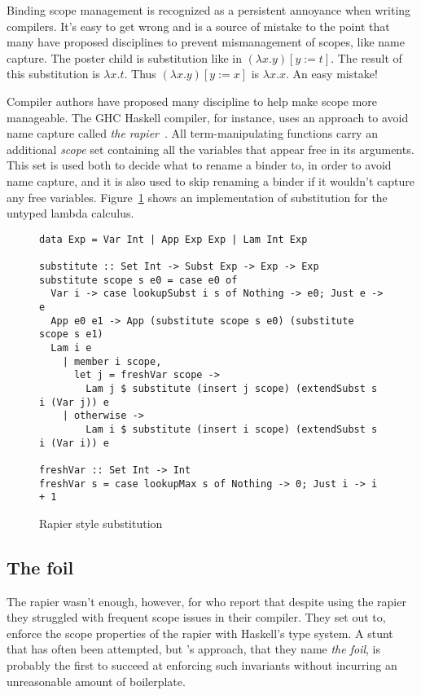\documentclass[sigconf, anonymous, review]{acmart}
\begin{document}
Binding scope management is recognized as a persistent annoyance when writing compilers.
It's easy to get wrong and is a source of mistake to the point that many have
proposed disciplines to prevent mismanagement of scopes, like name capture.
The poster child is substitution like in
$(\lambda x. y)[y:=t]$. The result of this substitution is $\lambda x. t$.
Thus $(\lambda x. y)[y:=x]$ is $\lambda x. x$. An easy mistake!

Compiler authors have proposed many discipline to help make scope more
manageable.
The GHC Haskell compiler, for instance, uses an approach to avoid name capture called
\textit{the rapier}~\cite{peytonjones02secrets}. All term-manipulating functions
carry an additional \textit{scope} set containing all the
variables that appear free in its arguments. This set is
used both to decide what to rename a binder to, in order to avoid name capture,
and it is also used to skip renaming a binder if it wouldn't capture any free
variables. Figure~\ref{rapier-style-substitution} shows an implementation of
substitution
for the untyped lambda calculus.

\begin{figure}
\begin{verbatim}
data Exp = Var Int | App Exp Exp | Lam Int Exp

substitute :: Set Int -> Subst Exp -> Exp -> Exp
substitute scope s e0 = case e0 of
  Var i -> case lookupSubst i s of Nothing -> e0; Just e -> e
  App e0 e1 -> App (substitute scope s e0) (substitute scope s e1)
  Lam i e
    | member i scope,
      let j = freshVar scope ->
        Lam j $ substitute (insert j scope) (extendSubst s i (Var j)) e
    | otherwise ->
        Lam i $ substitute (insert i scope) (extendSubst s i (Var i)) e

freshVar :: Set Int -> Int
freshVar s = case lookupMax s of Nothing -> 0; Just i -> i + 1
\end{verbatim}
\caption{Rapier style substitution}
\label{rapier-style-substitution}
\end{figure}

\subsection{The foil}
\label{the-rapier-with-stronger-types}

The rapier wasn't enough, however, for \citet{maclaurin23} who report that
despite using the rapier they struggled with frequent scope issues in their
compiler. They set out to, enforce the scope properties of the rapier with
Haskell's type system. A stunt that has often been attempted, but
\cite{maclaurin23}'s approach, that they name \emph{the foil}, is probably the
first to succeed at enforcing such invariants without incurring an unreasonable
amount of boilerplate.
\end{document}
